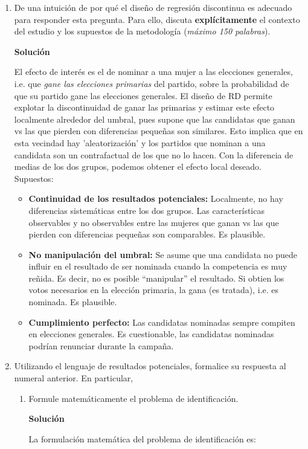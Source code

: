 \documentclass[a4paper, answers, addpoints, 11pt]{exam}
\newenvironment{solucion}{%
  \begin{mdframed}[
    backgroundcolor=blue!5,    %
    linecolor=blue!50,          %
    linewidth=2pt,              %
    leftmargin=10pt,            %
    rightmargin=8pt,           %
    topline=true,              %
    bottomline=true,            %
    roundcorner=10pt,           %
    innerleftmargin=10pt,       %
    innerrightmargin=10pt,      %
    innerbottommargin=10pt,     %
    innertopmargin=10pt         %
  ]%
  \begin{tcolorbox}[colframe=blue!50!black, colback=blue!50, coltitle=white, sharp corners=all, boxrule=1mm, width=\textwidth, halign=left, valign=center, top=0mm, bottom=0mm, left=0mm, right=0mm] \textbf{Solución} \end{tcolorbox} }{\end{mdframed}}
\begin{document}
\begin{enumerate}
    \item De una intuición de por qué el diseño de regresión discontinua es adecuado para responder esta pregunta. Para ello, discuta \textbf{explícitamente} el contexto del estudio y los supuestos de la metodología (\textit{máximo 150 palabras}).
\begin{solucion}
El efecto de interés es el de nominar a una mujer a las elecciones generales, i.e. que \textit{gane las elecciones primarias} del partido,  sobre la probabilidad de que su partido gane  las elecciones generales. El diseño de RD permite explotar la discontinuidad de ganar las primarias y estimar este efecto localmente alrededor del umbral, pues supone que las candidatas que ganan vs las que pierden con diferencias pequeñas son similares. Esto implica que en esta vecindad hay 'aleatorización' y los partidos que nominan a una candidata son un contrafactual de los que no lo hacen. Con la diferencia de medias de los dos grupos, podemos obtener el efecto local deseado.\\

Supuestos:
\begin{itemize}
\item \textbf{Continuidad de los resultados potenciales:} Localmente, no hay diferencias sistemáticas entre los dos grupos. Las características observables y no observables entre las mujeres que ganan vs las que pierden con diferencias pequeñas son comparables. Es plausible.
\item \textbf{No manipulación del umbral:} Se asume que una candidata no puede influir en el resultado de ser nominada cuando la competencia es muy reñida. Es decir, no es posible ``manipular'' el resultado. Si obtien los votos necesarios en la elección primaria, la gana (es tratada), i.e. es nominada.  Es plausible.
\item \textbf{Cumplimiento perfecto:} Las candidatas nominadas sempre compiten en elecciones generales. Es cuestionable, las candidatas nominadas podrían renunciar durante la campaña.
\end{itemize}
\end{solucion}

    \item Utilizando el lenguaje de resultados potenciales, formalice su respuesta al numeral anterior. En particular,

        \begin{enumerate}        
            \item Formule matemáticamente el problema de identificación.  
            \begin{solucion}
            La formulación matemática del problema de identificación es:
            

\end{solucion}
\end{enumerate}
\end{enumerate}
\end{document}
